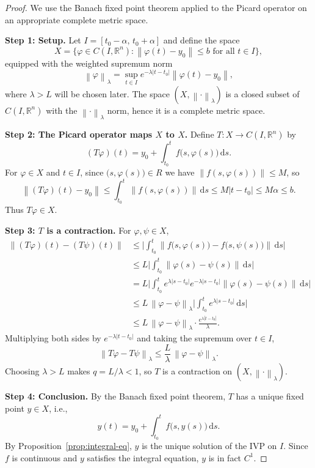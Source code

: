 \documentclass[12pt,a4paper,openany]{book}
\theoremstyle{definition}
\theoremstyle{plain}
\theoremstyle{remark}
\newcommand{\R}{\mathbb{R}}
\newcommand{\dd}{\mathrm{d}}
\newcommand{\abs}[1]{\left|#1\right|}
\newcommand{\norm}[1]{\left\|#1\right\|}
\begin{document}
\begin{proof}
We use the Banach fixed point theorem
applied to the Picard operator on an appropriate complete metric space.

\medskip
\textbf{Step 1: Setup.}
Let $I = [t_0 - \alpha, \, t_0 + \alpha]$ and define the space
\[
  X = \bigl\{\varphi \in C(I, \R^n) : \norm{\varphi(t) - y_0} \le b
  \text{ for all } t \in I\bigr\},
\]
equipped with the weighted supremum norm
\[
  \norm{\varphi}_\lambda = \sup_{t \in I}
  e^{-\lambda \abs{t - t_0}} \norm{\varphi(t) - y_0},
\]
where $\lambda > L$ will be chosen later. The space $(X, \norm{\cdot}_\lambda)$
is a closed subset of $C(I, \R^n)$ with the $\norm{\cdot}_\lambda$ norm, hence
it is a complete metric space.

\medskip
\textbf{Step 2: The Picard operator maps $X$ to $X$.}
Define $T\colon X \to C(I, \R^n)$ by
\[
  (T\varphi)(t) = y_0 + \int_{t_0}^{t} f\bigl(s, \varphi(s)\bigr)\,\dd s.
\]
For $\varphi \in X$ and $t \in I$, since $\bigl(s, \varphi(s)\bigr) \in R$ we have
$\norm{f(s,\varphi(s))} \le M$, so
\[
  \norm{(T\varphi)(t) - y_0}
  \le \int_{t_0}^{t} \norm{f(s, \varphi(s))}\,\dd s
  \le M \abs{t - t_0}
  \le M\alpha \le b.
\]
Thus $T\varphi \in X$.

\medskip
\textbf{Step 3: $T$ is a contraction.}
For $\varphi, \psi \in X$,
\begin{align*}
  \norm{(T\varphi)(t) - (T\psi)(t)}
  &\le \biggl|\int_{t_0}^{t}
       \norm{f\bigl(s,\varphi(s)\bigr) - f\bigl(s,\psi(s)\bigr)}\,\dd s\biggr| \\
  &\le L \biggl|\int_{t_0}^{t} \norm{\varphi(s) - \psi(s)}\,\dd s\biggr| \\
  &= L \biggl|\int_{t_0}^{t} e^{\lambda\abs{s-t_0}}
     e^{-\lambda\abs{s-t_0}} \norm{\varphi(s) - \psi(s)}\,\dd s\biggr| \\
  &\le L\,\norm{\varphi - \psi}_\lambda
     \biggl|\int_{t_0}^{t} e^{\lambda\abs{s-t_0}}\,\dd s\biggr| \\
  &\le L\,\norm{\varphi - \psi}_\lambda \cdot
     \frac{e^{\lambda\abs{t-t_0}}}{\lambda}.
\end{align*}
Multiplying both sides by $e^{-\lambda\abs{t-t_0}}$ and taking the supremum
over $t \in I$,
\[
  \norm{T\varphi - T\psi}_\lambda
  \le \frac{L}{\lambda}\,\norm{\varphi - \psi}_\lambda.
\]
Choosing $\lambda > L$ makes $q = L/\lambda < 1$, so $T$ is a contraction on
$(X, \norm{\cdot}_\lambda)$.

\medskip
\textbf{Step 4: Conclusion.}
By the Banach fixed point theorem, $T$ has a unique fixed point $y \in X$, i.e.,
\[
  y(t) = y_0 + \int_{t_0}^t f\bigl(s, y(s)\bigr)\,\dd s.
\]
By Proposition~\ref{prop:integral-eq}, $y$ is the unique solution of the IVP on
$I$. Since $f$ is continuous and $y$ satisfies the integral equation, $y$ is in
fact $C^1$.
\end{proof}
\end{document}
